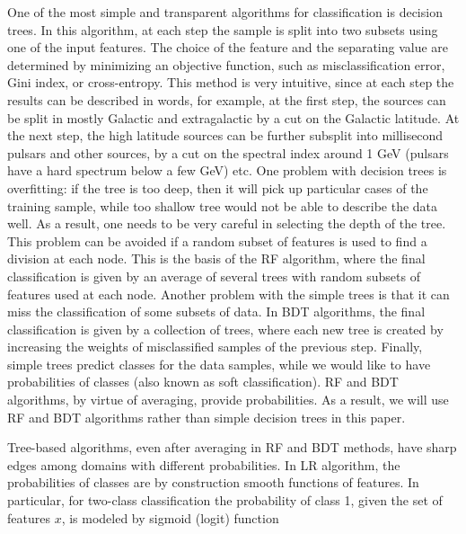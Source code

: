 One of the most simple and transparent algorithms for classification is decision trees.
In this algorithm, at each step the sample is split into two subsets using one of the input features.
The choice of the feature and the separating value are determined by minimizing an objective function, such as misclassification
error, Gini index, or cross-entropy.
This method is very intuitive, since at each step the results can be described in words, 
for example, at the first step, the sources can be split in mostly Galactic and extragalactic by a cut on the Galactic latitude.
At the next step, the high latitude sources can be further subsplit into millisecond pulsars and other sources, by a cut on the spectral index around 1 GeV (pulsars have a hard spectrum below a few GeV) etc.
One problem with decision trees is overfitting: if the tree is too deep, then it will pick up particular cases of the training sample, while too shallow tree would not be able to describe the data well. As a result, one needs to be very careful in selecting the depth of the tree.
This problem can be avoided if a random subset of features is used to find a division at each node. This is the basis of the RF algorithm,
where the final classification is given by an average of several trees with random subsets of features used at each node.
Another problem with the simple trees is that it can miss the classification of some subsets of data. In BDT algorithms, the final classification is given by a collection of trees, where each new tree is created by increasing the weights of misclassified samples of the previous step. 
Finally, simple trees predict classes for the data samples, while we would like to have probabilities of classes (also known as soft classification).
RF and BDT algorithms, by virtue of averaging, provide probabilities. As a result, we will use RF and BDT algorithms rather than simple decision trees in this paper.

Tree-based algorithms, even after averaging in RF and BDT methods, have sharp edges among domains with different probabilities.
In LR algorithm, the probabilities of classes are by construction smooth functions of features.
In particular, for two-class classification the probability of class 1, given the set of features $x$, is modeled by sigmoid (logit) function

